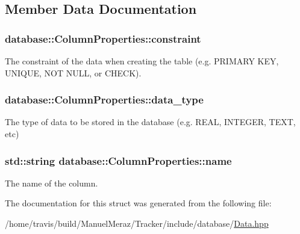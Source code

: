 \subsection{Member Data Documentation}
\subsubsection[{\texorpdfstring{constraint}{constraint}}]{ database\+::\+Column\+Properties\+::constraint}\hypertarget{structdatabase_1_1_column_properties_a587d4ebc4c0e8ebfa48e336a08f234f5}{}\label{structdatabase_1_1_column_properties_a587d4ebc4c0e8ebfa48e336a08f234f5}


The constraint of the data when creating the table (e.\+g. P\+R\+I\+M\+A\+RY K\+EY, U\+N\+I\+Q\+UE, N\+OT N\+U\+LL, or C\+H\+E\+CK). 

\subsubsection[{\texorpdfstring{data\+\_\+type}{data_type}}]{ database\+::\+Column\+Properties\+::data\+\_\+type}\hypertarget{structdatabase_1_1_column_properties_a34af986257f79a7b2c9ad2e01013f99e}{}\label{structdatabase_1_1_column_properties_a34af986257f79a7b2c9ad2e01013f99e}


The type of data to be stored in the database (e.\+g. R\+E\+AL, I\+N\+T\+E\+G\+ER, T\+E\+XT, etc) 

\subsubsection[{\texorpdfstring{name}{name}}]{\setlength{\rightskip}{0pt plus 5cm}std\+::string database\+::\+Column\+Properties\+::name}\hypertarget{structdatabase_1_1_column_properties_a69a1e887784799661e9345b0f4d88256}{}\label{structdatabase_1_1_column_properties_a69a1e887784799661e9345b0f4d88256}


The name of the column. 



The documentation for this struct was generated from the following file\+:\begin{DoxyCompactItemize}
\item 
/home/travis/build/\+Manuel\+Meraz/\+Tracker/include/database/\hyperlink{_data_8hpp}{Data.\+hpp}\end{DoxyCompactItemize}
